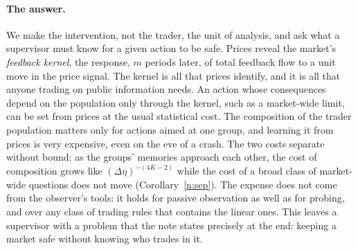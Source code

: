 \paragraph{The answer.} We make the intervention, not the trader, the unit of analysis, and ask what a supervisor must know for a given action to be safe. Prices reveal the market's \emph{feedback kernel}, the response, $m$ periods later, of total feedback flow to a unit move in the price signal. The kernel is all that prices identify, and it is all that anyone trading on public information needs. An action whose consequences depend on the population only through the kernel, such as a market-wide limit, can be set from prices at the usual statistical cost. The composition of the trader population matters only for actions aimed at one group, and learning it from prices is very expensive, even on the eve of a crash. The two costs separate without bound: as the groups' memories approach each other, the cost of composition grows like $(\Delta\eta)^{-(4K-2)}$ while the cost of a broad class of market-wide questions does not move (Corollary~\ref{n:sep}). The expense does not come from the observer's tools: it holds for passive observation as well as for probing, and over any class of trading rules that contains the linear ones. This leaves a supervisor with a problem that the note states precisely at the end: keeping a market safe without knowing who trades in it.

